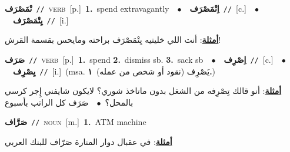\documentclass[10pt,a4paper,twoside]{article} %
\begin{document}
\begin{multicols}{2}
{\setlength\topsep{0pt}\textbf{\foreignlanguage{arabic}{تْمَصْرَف}}\ {\color{gray}\texttt{//}\color{black}}\ \textsc{verb}\ [p.]\ \textbf{1.}~spend extravagantly\ \ $\bullet$\ \ \setlength\topsep{0pt}\textbf{\foreignlanguage{arabic}{اِتْمَصْرَف}}\ {\color{gray}\texttt{//}\color{black}}\ [c.]\ \ $\bullet$\ \ \setlength\topsep{0pt}\textbf{\foreignlanguage{arabic}{يِتْمَصْرَف}}\ {\color{gray}\texttt{//}\color{black}}\ [i.]\  \begin{flushright}\color{gray}\foreignlanguage{arabic}{\textbf{\underline{\foreignlanguage{arabic}{أمثلة}}}: أنت اللي خليتيه يِتْمَصْرَف براحته ومايحس بقسمة القرش!}\end{flushright}\color{black}} \vspace{2mm}

{\setlength\topsep{0pt}\textbf{\foreignlanguage{arabic}{صَرَف}}\ {\color{gray}\texttt{//}\color{black}}\ \textsc{verb}\ [p.]\ \textbf{1.}~spend  \textbf{2.}~dismiss sb.  \textbf{3.}~sack sb\ \ $\bullet$\ \ \setlength\topsep{0pt}\textbf{\foreignlanguage{arabic}{اِصْرِف}}\ {\color{gray}\texttt{//}\color{black}}\ [c.]\ \ $\bullet$\ \ \setlength\topsep{0pt}\textbf{\foreignlanguage{arabic}{يِصْرِف}}\ {\color{gray}\texttt{//}\color{black}}\ [i.]\ \color{gray}(msa. \foreignlanguage{arabic}{يَصْرِف (نقود أو شخص من عمله)}~\foreignlanguage{arabic}{\textbf{١.}})\color{black}\  \begin{flushright}\color{gray}\foreignlanguage{arabic}{\textbf{\underline{\foreignlanguage{arabic}{أمثلة}}}: أنو قالك تِصْرِفه من الشغل بدون ماتاخذ شوري؟ لايكون شايفني إِجر كرسي بالمحل؟\ $\bullet$\ \  صَرَف كل الراتب بأسبوع}\end{flushright}\color{black}} \vspace{2mm}

{\setlength\topsep{0pt}\textbf{\foreignlanguage{arabic}{صَرَّاف}}\ {\color{gray}\texttt{//}\color{black}}\ \textsc{noun}\ [m.]\ \textbf{1.}~ATM machine\  \begin{flushright}\color{gray}\foreignlanguage{arabic}{\textbf{\underline{\foreignlanguage{arabic}{أمثلة}}}: في عقبال دوار المنارة صَرّاف للبنك العربي}\end{flushright}\color{black}} \vspace{2mm}


\end{multicols}
\end{document}
